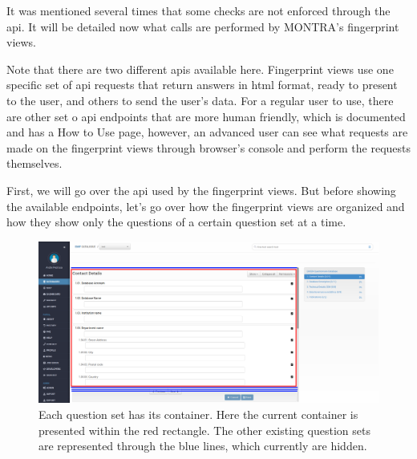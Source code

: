 
It was mentioned several times that some checks are not enforced through the \gls{api}.
It will be detailed now what calls are performed by MONTRA's fingerprint views.

Note that there are two different \gls{api}s available here.
Fingerprint views use one specific set of \gls{api} requests that return answers in \gls{html} format, ready to present to the user, and others to send the user's data.
For a regular user to use, there are other set o \gls{api} endpoints that are more human friendly, which is documented and has a How to Use page, however, an advanced user can see what requests are made on the fingerprint views through browser's console and perform the requests themselves.

First, we will go over the \gls{api} used by the fingerprint views.
But before showing the available endpoints, let's go over how the fingerprint views are organized and how they show only the questions of a certain question set at a time.

\begin{figure}[H]
    \center
    \includegraphics[width=\textwidth]{fingerprint-hidden-question-sets}
    \caption{Each question set has its container.
    Here the current container is presented within the red rectangle.
    The other existing question sets are represented through the blue lines, which currently are hidden.}
    \label{fig:fingerprint-hidden-question-sets}
\end{figure}


